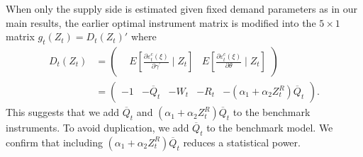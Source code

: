 \documentclass[11pt, a4paper]{article}
\begin{document}
When only the supply side is estimated given fixed demand parameters as in our main results, the earlier optimal instrument matrix is modified into the $5\times 1$ matrix $g_{t}(Z_{t})=D_{t}(Z_{t})'$ where 
\begin{align*}
    D_{t}(Z_{t}) &= \begin{pmatrix}
     & 
    E\left[\frac{\partial \varepsilon_{t}^{c}(\xi)}{\partial \gamma^{\prime}} \mid Z_{t}\right] & 
    E\left[\frac{\partial \varepsilon_{t}^{c}(\xi)}{\partial \theta} \mid Z_{t}\right]
    \end{pmatrix} \\
    &=\begin{pmatrix}
    -1 &
    -\overline{Q}_{t} &
    -W_{t} &
    -R_{t} &
    -(\alpha_1 + \alpha_2 Z^{R}_{t})\overline{Q}_{t}
    \end{pmatrix}.
\end{align*}
This suggests that we add $\overline{Q}_{t}$ and $(\alpha_1 + \alpha_2 Z^{R}_{t})\overline{Q}_{t}$ to the benchmark instruments. To avoid duplication, we add $\overline{Q}_{t}$ to the benchmark model. We confirm that including $(\alpha_1 + \alpha_2 Z^{R}_{t})\overline{Q}_{t}$ reduces a statistical power.
\end{document}
